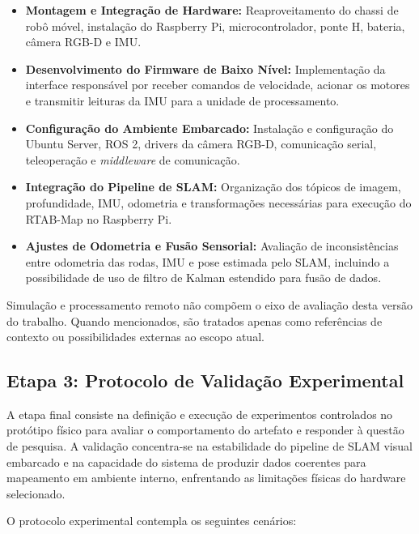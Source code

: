 \begin{itemize}
    \item \textbf{Montagem e Integração de Hardware:} Reaproveitamento do chassi de robô móvel, instalação do Raspberry Pi, microcontrolador, ponte H, bateria, câmera RGB-D e IMU.

    \item \textbf{Desenvolvimento do Firmware de Baixo Nível:} Implementação da interface responsável por receber comandos de velocidade, acionar os motores e transmitir leituras da IMU para a unidade de processamento.
    
    \item \textbf{Configuração do Ambiente Embarcado:} Instalação e configuração do Ubuntu Server, ROS 2, drivers da câmera RGB-D, comunicação serial, teleoperação e \textit{middleware} de comunicação.

    \item \textbf{Integração do Pipeline de SLAM:} Organização dos tópicos de imagem, profundidade, IMU, odometria e transformações necessárias para execução do RTAB-Map no Raspberry Pi.
    
    \item \textbf{Ajustes de Odometria e Fusão Sensorial:} Avaliação de inconsistências entre odometria das rodas, IMU e pose estimada pelo SLAM, incluindo a possibilidade de uso de filtro de Kalman estendido para fusão de dados.
\end{itemize}

Simulação e processamento remoto não compõem o eixo de avaliação desta versão do trabalho. Quando mencionados, são tratados apenas como referências de contexto ou possibilidades externas ao escopo atual.

\subsection{Etapa 3: Protocolo de Validação Experimental}
\label{ssec:etapa3_validacao}

A etapa final consiste na definição e execução de experimentos controlados no protótipo físico para avaliar o comportamento do artefato e responder à questão de pesquisa. A validação concentra-se na estabilidade do pipeline de SLAM visual embarcado e na capacidade do sistema de produzir dados coerentes para mapeamento em ambiente interno, enfrentando as limitações físicas do hardware selecionado.

O protocolo experimental contempla os seguintes cenários:

